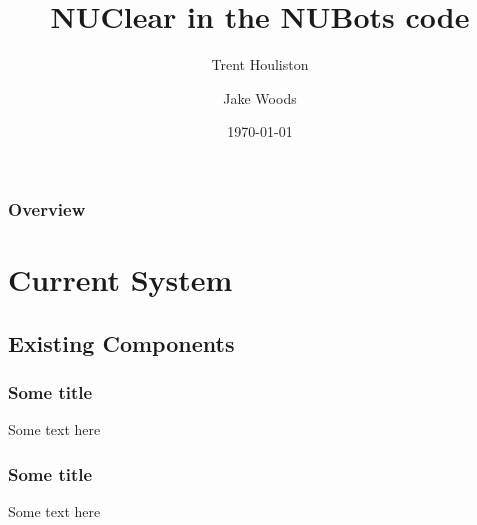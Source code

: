 \documentclass{beamer}
\title[Short title]{NUClear in the NUBots code}
\author{
    Trent Houliston \and Jake Woods
}
\institute[UoN]
{
    University of Newcastle \\ %
    \medskip
    \textit{Trent.Houliston@uon.edu.au, Jake.f.woods@gmail.com} %
}
\date{\today}
\begin{document}
\begin{frame}
    \titlepage %
\end{frame}


\begin{frame}
    \frametitle{Overview}
    \tableofcontents
\end{frame}

\section{Current System}
\subsection{Existing Components}
\begin{frame}
    \frametitle{Some title}
    Some text here
\end{frame}

\begin{frame}
    \frametitle{Some title}
    Some text here
\end{frame}
\end{document}
